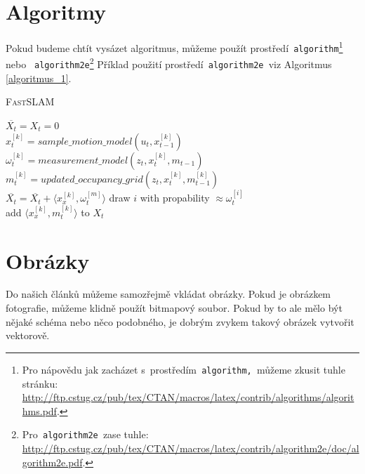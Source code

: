 \documentclass[a4paper, 11pt]{article}
\begin{document}
\pagebreak
\section{Algoritmy}
\label{sekce_3}
Pokud budeme chtít vysázet algoritmus, můžeme použít prostředí\texttt{ algorithm}\footnote{Pro nápovědu jak zacházet
s~prostředím\texttt{ algorithm, }můžeme zkusit tuhle stránku:\\ \url{http://ftp.cstug.cz/pub/tex/CTAN/macros/latex/contrib/algorithms/algorithms.pdf}.}
nebo \texttt{ algorithm2e}\footnote{Pro\texttt{ algorithm2e }zase tuhle: \url{http://ftp.cstug.cz/pub/tex/CTAN/macros/latex/contrib/algorithm2e/doc/algorithm2e.pdf}.}
Příklad použití prostředí\verb| algorithm2e |viz Algoritmus \ref{algoritmus_1}.
\bigskip

\begin{algorithm}[h]
    \label{algoritmus_1}
    \caption{\textsc{FastSLAM}}
    \SetInd{1em}{1em}
    \SetNlSty{}{}{:}
    \SetNlSkip{-1.2em}
    
	\BlankLine
	\Indpp \Indp
	$ \overline{X_t} = X_t = 0 $ \\
	    { $ x_t^{[k]} = sample\_motion\_model(u_t, x_{t-1}^{[k]}) $ \\
	      $ \omega_t^{[k]} = measurement\_model(z_t, x_t^{[k]}, m_{t-1}) $ \\
	      $ m_t^{[k]} = updated\_occupancy\_grid(z_t, x_t^{[k]}, m_{t-1}^{[k]}) $ \\
	      $ \overline{X_t} = \overline{X_t} + \langle x_x^{[k]}, \omega_t^{[m]} \rangle $ }
        { draw $i$ with propability $ \approx \omega_t^{[i]} $ \\
          add $ \langle x_x^{[k]}, m_t^{[k]} \rangle $ to $X_t$ }
\end{algorithm}


\section{Obrázky}
Do našich článků můžeme samozřejmě vkládat obrázky. Pokud je obrázkem fotografie,
můžeme klidně použít bitmapový soubor. Pokud by to ale mělo být nějaké schéma nebo něco podobného,
je dobrým zvykem takový obrázek vytvořit vektorově.
\end{document}
